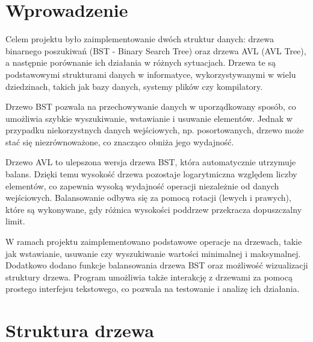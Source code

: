 \documentclass{article}
\begin{document}
	\section{Wprowadzenie}
    
Celem projektu było zaimplementowanie dwóch struktur danych: drzewa binarnego poszukiwań (BST - Binary Search Tree) oraz drzewa AVL (AVL Tree), a następnie porównanie ich działania w różnych sytuacjach. Drzewa te są podstawowymi strukturami danych w informatyce, wykorzystywanymi w wielu dziedzinach, takich jak bazy danych, systemy plików czy kompilatory.

Drzewo BST pozwala na przechowywanie danych w uporządkowany sposób, co umożliwia szybkie wyszukiwanie, wstawianie i usuwanie elementów. Jednak w przypadku niekorzystnych danych wejściowych, np. posortowanych, drzewo może stać się niezrównoważone, co znacząco obniża jego wydajność.

Drzewo AVL to ulepszona wersja drzewa BST, która automatycznie utrzymuje balans. Dzięki temu wysokość drzewa pozostaje logarytmiczna względem liczby elementów, co zapewnia wysoką wydajność operacji niezależnie od danych wejściowych. Balansowanie odbywa się za pomocą rotacji (lewych i prawych), które są wykonywane, gdy różnica wysokości poddrzew przekracza dopuszczalny limit.

W ramach projektu zaimplementowano podstawowe operacje na drzewach, takie jak wstawianie, usuwanie czy wyszukiwanie wartości minimalnej i maksymalnej. Dodatkowo dodano funkcje balansowania drzewa BST oraz możliwość wizualizacji struktury drzewa. Program umożliwia także interakcję z drzewami za pomocą prostego interfejsu tekstowego, co pozwala na testowanie i analizę ich działania.
	
	\section{Struktura drzewa}
	
	\begin{figure} [H]
		\noindent{}
	\end{figure}
\newpage
\end{document}

